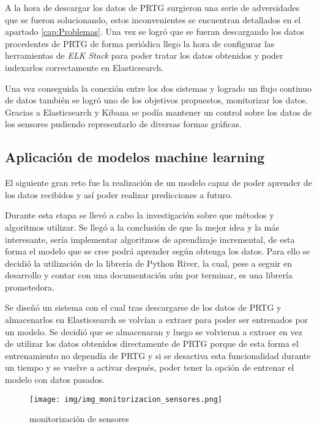 A la hora de descargar los datos de PRTG surgieron una serie de adversidades que se fueron solucionando, estos inconvenientes se encuentran detallados en el apartado \ref{cap:Problemas}. Una vez se logró que se fueran descargando los datos procedentes de PRTG de forma periódica llego la hora de configurar las herramientas de \textit{ELK Stack} para poder tratar los datos obtenidos y poder indexarlos correctamente en Elasticsearch.

Una vez conseguida la conexión entre los dos sistemas y logrado un flujo continuo de datos también se logró uno de los objetivos propuestos, monitorizar los datos. Gracias a Elasticsearch y Kibana se podía mantener un control sobre los datos de los sensores pudiendo representarlo de diversas formas gráficas.

\subsection{Aplicación de modelos machine learning}

El siguiente gran reto fue la realización de un modelo capaz de poder aprender de los datos recibidos y así poder realizar predicciones a futuro.

Durante esta etapa se llevó a cabo la investigación sobre que métodos y algoritmos utilizar. Se llegó a la conclusión de que la mejor idea y la más interesante, sería implementar algoritmos de aprendizaje incremental, de esta forma el modelo que se cree podrá aprender según obtenga los datos. Para ello se decidió la utilización de la librería de Python River, la cual, pese a seguir en desarrollo y contar con una documentación aún por terminar, es una librería prometedora.

Se diseñó un sistema con el cual tras descargarse de los datos de PRTG y almacenarlos en Elasticsearch se volvían a extraer para poder ser entrenados por un modelo. Se decidió que se almacenaran y luego se volvieran a extraer en vez de utilizar los datos obtenidos directamente de PRTG porque de esta forma el entrenamiento no dependía de PRTG y si se desactiva esta funcionalidad durante un tiempo y se vuelve a activar después, poder tener la opción de entrenar el modelo con datos pasados.

\begin{figure}[h]
	\centering
	\texttt{[image: img/img\_monitorizacion\_sensores.png]}
	\caption{monitorización de sensores}
	\label{img_monitorizacion_sensores}
\end{figure}

